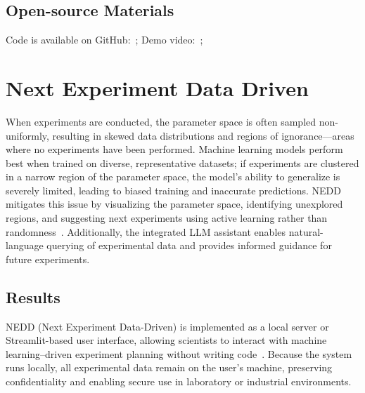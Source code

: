 \subsection*{Open-source Materials}
Code is available on GitHub: \,; Demo video: \,;






\section{Next Experiment Data Driven}

When experiments are conducted, the parameter space is often sampled non-uniformly, resulting in skewed data distributions and regions of ignorance—areas where no experiments have been performed. Machine learning models perform best when trained on diverse, representative datasets; if experiments are clustered in a narrow region of the parameter space, the model’s ability to generalize is severely limited, leading to biased training and inaccurate predictions. NEDD mitigates this issue by visualizing the parameter space, identifying unexplored regions, and suggesting next experiments using active learning rather than randomness~\cite{wei2025discovering}. Additionally, the integrated LLM assistant enables natural-language querying of experimental data and provides informed guidance for future experiments.

\subsection*{Results}
NEDD (Next Experiment Data-Driven) is implemented as a local server or Streamlit-based user interface, allowing scientists to interact with machine learning–driven experiment planning without writing code~\cite{khorasani2022web}. Because the system runs locally, all experimental data remain on the user’s machine, preserving confidentiality and enabling secure use in laboratory or industrial environments.

